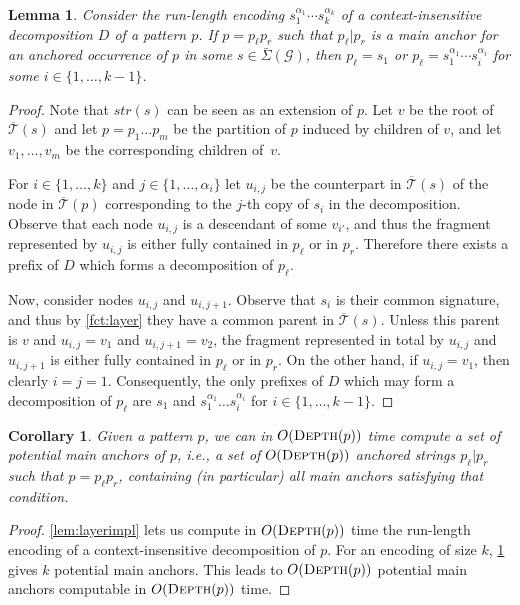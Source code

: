 \documentclass[a4paper]{article}
\newtheorem{lemma}[theorem]{Lemma}
\newtheorem{corollary}[theorem]{Corollary}
\theoremstyle{remark}
\newcommand{\sigs}{\bar{\Sigma}}
\newcommand{\depth}{\textsc{Depth}}
\newcommand{\grammar}{\mathcal{G}}
\newcommand{\sstr}{\textit{str}}
\newcommand{\ustree}{\mathcal{\overline{T}}}
\begin{document}
\begin{lemma}\label{lem:maina}
Consider the run-length encoding $s_1^{\alpha_1}\cdots s_k^{\alpha_k}$ of a context-insensitive decomposition $D$ of a pattern $p$.
If $p=p_\ell p_r$ such that $p_\ell|p_r$ is a main anchor for an anchored occurrence of $p$ in some $s\in\sigs(\grammar)$, then $p_\ell = s_1$ or $p_\ell=s_1^{\alpha_1}\cdots s_i^{\alpha_i}$ for some $i\in\{1,\ldots,k-1\}$.
\end{lemma}
\begin{proof}
Note that $\sstr(s)$ can be seen as an extension of $p$.
Let $v$ be the root of $\ustree(s)$ and let $p=p_1\ldots p_m$ be the partition of $p$ induced by children of $v$, and let $v_1,\ldots,v_m$ be the corresponding children of~$v$.


For $i\in\{1,\ldots,k\}$ and $j\in \{1,\ldots,\alpha_i\}$ let $u_{i,j}$ be the counterpart in $\ustree(s)$ of the node
in $\ustree(p)$ corresponding to the $j$-th copy of $s_i$ in the decomposition.
Observe that each node $u_{i,j}$ is a descendant of some $v_{i'}$, and thus the fragment represented by $u_{i,j}$
is either fully contained in $p_\ell$ or in $p_r$.
Therefore there exists a prefix of $D$ which forms a decomposition of $p_\ell$.

Now, consider nodes $u_{i,j}$ and $u_{i,j+1}$. Observe that $s_i$ is their common signature, and thus by \cref{fct:layer} they have a common parent in $\ustree(s)$.
Unless this parent is $v$ and $u_{i,j}=v_1$ and $u_{i,j+1}=v_2$, the fragment represented in total by $u_{i,j}$ and $u_{i,j+1}$ is either
fully contained in $p_\ell$ or in $p_r$.
On the other hand, if $u_{i,j}=v_1$, then clearly $i=j=1$.
Consequently, the only prefixes of $D$ which may form a decomposition of $p_\ell$ are $s_1$ and $s_1^{\alpha_1}\ldots s_{i}^{\alpha_i}$
for  $i\in\{1,\ldots,k-1\}$.
\end{proof}
\begin{corollary}\label{cor:maina}
Given a pattern $p$, we can in $O(\depth(p))$ time compute a set of \emph{potential main anchors} of $p$,
i.e., a set of $O(\depth(p))$ anchored strings $p_\ell|p_r$ such that $p=p_\ell p_r$, containing (in particular) all main anchors satisfying that condition.
\end{corollary}
\begin{proof}
\cref{lem:layerimpl} lets us compute in $O(\depth(p))$ time the run-length encoding of a context-insensitive decomposition of $p$.
For an encoding of size $k$, \cref{lem:maina} gives $k$ potential main anchors.
This leads to  $O(\depth(p))$ potential main anchors computable in $O(\depth(p))$ time.
\end{proof}
\end{document}

